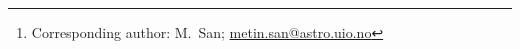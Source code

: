 \newcommand{\oslo}[0]{1}
\newcommand{\iiabangalore}[0]{2}

\author{\small
M.~San\thanks{Corresponding author: M.~San; \url{metin.san@astro.uio.no}}
\and
D.~J.~Watts
\and
M.~Galloway
\and
E.~Gjerl\o w
\and
R.~Aurlien
\and
A.~Basyrov
\and
M.~Brilenkov
\and
H.~K.~Eriksen
\and
U.~Fuskeland
\and
D.~Herman
\and
H.~T.~Ihle
\and
J.~G.~S.~Lunde
\and
S.~K.~Næss
\and
N.-O.~Stutzer
\and
H.~Thommesen
\and
I.~K.~Wehus
}
